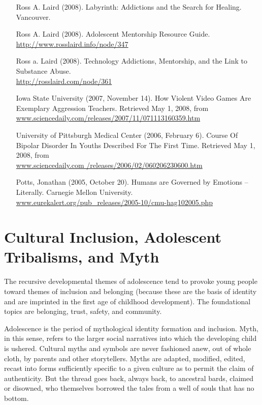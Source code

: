 \documentclass[12pt,DIV9,oneside,headsepline,footsepline]{scrreprt}
\begin{document}
\begin{itemize}

\item [Ross A. Laird] (2008). Labyrinth: Addictions and the Search for
Healing. Vancouver.

\item [Ross A. Laird] (2008). Adolescent Mentorship Resource Guide. \\
\url{http://www.rosslaird.info/node/347}

\item [Ross a. Laird] (2008). Technology Addictions, Mentorship, and
the Link to Substance Abuse. \\
\url{http://rosslaird.com/node/361}

\item [Iowa State University] (2007, November 14). How Violent Video
Games Are Exemplary Aggression Teachers. Retrieved May 1, 2008, from
\\
\url{www.sciencedaily.com/releases/2007/11/071113160359.htm}

\item [University of Pittsburgh Medical Center] (2006, February 6).
Course Of Bipolar Disorder In Youths Described For The First Time.
Retrieved May 1, 2008, from \\
\url{www.sciencedaily.com­ /releases/2006/02/060206230600.htm}

\item [Potts, Jonathan] (2005, October 20). Humans are Governed by
Emotions -- Literally. Carnegie Mellon University. \\
\url{www.eurekalert.org/pub_releases/2005-10/cmu-hag102005.php}

\end{itemize}

\section{Cultural Inclusion, Adolescent Tribalisms, and Myth}

The recursive developmental themes of adolescence tend to provoke
young people toward themes of inclusion and belonging (because these
are the basis of identity and are imprinted in the first age of
childhood development). The foundational topics are belonging, trust,
safety, and community.

Adolescence is the period of mythological identity formation and
inclusion. Myth, in this sense, refers to the larger social narratives
into which the developing child is ushered. Cultural myths and symbols
are never fashioned anew, out of whole cloth, by parents and other
storytellers. Myths are adapted, modified, edited, recast into forms
sufficiently specific to a given culture as to permit the claim of
authenticity. But the thread goes back, always back, to ancestral
bards, claimed or disowned, who themselves borrowed the tales from a
well of souls that has no bottom.
\end{document}
